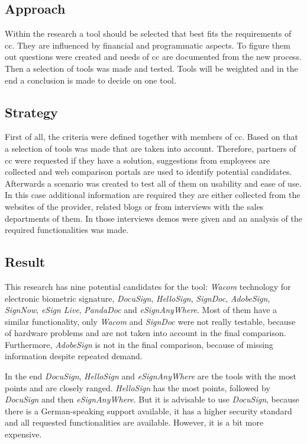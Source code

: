 \subsection{Approach}
Within the research a tool should be selected that best fits the requirements of \gls{cc}. They are influenced by financial and programmatic aspects. To figure them out questions were created and needs of \gls{cc} are documented from the new process. Then a selection of tools was made and tested. Tools will be weighted and in the end a conclusion is made to decide on one tool.  


\subsection{Strategy}
First of all, the criteria were defined together with members of \gls{cc}. Based on that a selection of tools was made that are taken into account. Therefore, partners of \gls{cc} were requested if they have a solution, suggestions from employees are collected and web comparison portals are used to identify potential candidates. Afterwards a scenario was created to test all of them on usability and ease of use. In this case additional information are required they are either collected from the websites of the provider, related blogs or from interviews with the sales departments of them. In those interviews demos were given and an analysis of the required functionalities was made.  

\subsection{Result}
This research has nine potential candidates for the tool: \textit{Wacom} technology for electronic biometric signature, \textit{DocuSign}, \textit{HelloSign}, \textit{SignDoc}, \textit{AdobeSign}, \textit{SignNow}, \textit{eSign Live}, \textit{PandaDoc} and \textit{eSignAnyWhere}. Most of them have a similar functionality, only \textit{Wacom} and \textit{SignDoc} were not really testable, because of hardware problems and are not taken into account in the final comparison. Furthermore, \textit{AdobeSign} is not in the final comparison, because of missing information despite repeated demand.

In the end \textit{DocuSign}, \textit{HelloSign} and \textit{eSignAnyWhere} are the tools with the most points and are closely ranged. \textit{HelloSign} has the most points, followed by \textit{DocuSign} and then \textit{eSignAnyWhere}. But it is advisable to use \textit{DocuSign}, because there is a German-speaking support available, it has a higher security standard and all requested functionalities are available. However, it is a bit more expensive.  

